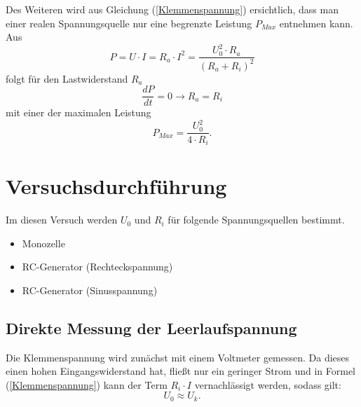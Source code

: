 \documentclass[11pt,ngerman,a4paper]{article}
\begin{document}
Des Weiteren wird aus Gleichung (\ref{Klemmenspannung}) ersichtlich, dass man einer realen Spannungsquelle nur eine begrenzte Leistung $P_{Max}$ entnehmen kann. Aus 
\begin{equation}
P = U \cdot I = R_a \cdot I^2 = \frac{U_0^2 \cdot R_a}{(R_a+R_i)^2}
\label{erw_leistung}
\end{equation}
folgt f\"ur den Lastwiderstand $R_a$
\begin{equation}
\frac{dP}{dt} = 0 \rightarrow R_a = R_i
\label{leistungsanpassung}
\end{equation}
mit einer der maximalen Leistung 
\begin{equation}
P_{Max} = \frac{U_0^2}{4\cdot R_i}.
\end{equation}

\section{Versuchsdurchf\"uhrung}
Im diesen Versuch werden $U_0$ und $R_i$ f\"ur folgende Spannungsquellen bestimmt. 
\begin{itemize}
\item Monozelle
\item RC-Generator (Rechteckspannung)
\item RC-Generator (Sinusspannung)
\end{itemize}
\subsection{Direkte Messung der Leerlaufspannung}
Die Klemmenspannung wird zun\"achst mit einem Voltmeter gemessen. Da dieses einen hohen Eingangswiderstand hat, flie\ss t nur ein geringer Strom und in Formel (\ref{Klemmenspannung}) kann der Term $R_i \cdot I$ vernachl\"assigt werden, sodass gilt: 
\begin{equation}
U_0 \approx U_k.
\end{equation} 
\end{document}
